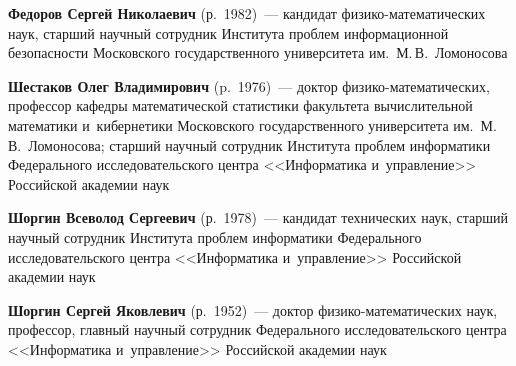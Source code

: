 \begin{multicols}{2}

\pagebreak



\noindent
\textbf{Федоров Сергей Николаевич} (р.\ 1982)~--- 
кандидат фи\-зи\-ко-ма\-те\-ма\-ти\-че\-ских наук, 
старший научный сотрудник Института проб\-лем информационной безопасности 
Московского государственного университета им.\ М.\,В.~Ломоносова


\vspace*{6pt}

\noindent
\textbf{Шестаков Олег Владимирович} (p.\ 1976)~---
доктор фи\-зи\-ко-ма\-те\-ма\-ти\-че\-ских, профессор кафедры математической 
статистики факультета вычислительной математики 
и~кибернетики Московского\linebreak
 государственного университета им.\ М.\,В.~Ломоносова;
 старший научный со\-труд\-ник Института \mbox{проб\-лем} информатики Федерального 
 исследовательского центра <<Информатика и~управ\-ле\-ние>> Российской академии наук
 

 
 \vspace*{6pt}
 
 \noindent
\textbf{Шоргин Всеволод Сергеевич} (р.\ 1978)~--- кандидат технических наук, 
старший научный сотрудник 
Института проб\-лем информатики Федерального исследовательского центра 
<<Информатика и~управ\-ле\-ние>> Российской академии наук



\vspace*{6pt}

\noindent
\textbf{Шоргин Сергей Яковлевич} (р.\ 1952)~--- 
доктор фи\-зи\-ко-ма\-те\-ма\-ти\-че\-ских наук, профессор, главный научный 
со\-труд\-ник Федерального исследовательского центра <<Информатика и~управ\-ле\-ние>>
Российской академии наук


\def\leftkol{ОБ АВТОРАХ}

\def\rightkol{ОБ АВТОРАХ}


 \label{end\stat}






\end{multicols}

\def\leftkol{ОБ АВТОРАХ}
\def\rightkol{ОБ АВТОРАХ}

\newpage